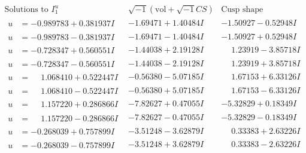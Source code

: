 \documentclass[1p]{elsarticle_modified}
\theoremstyle{definition}
\newcommand{\I}{\sqrt{-1}}
\begin{document}
$$\begin{array}{c|c|c}  
\text{Solutions to }I^u_{1}& \I (\text{vol} + \sqrt{-1}CS) & \text{Cusp shape}\\
 \hline 
\begin{aligned}
u &= -0.989783 + 0.381937 I\end{aligned}
 & -1.69471 + 1.40484 I & -1.50927 - 0.52948 I \\ \hline\begin{aligned}
u &= -0.989783 - 0.381937 I\end{aligned}
 & -1.69471 - 1.40484 I & -1.50927 + 0.52948 I \\ \hline\begin{aligned}
u &= -0.728347 + 0.560551 I\end{aligned}
 & -1.44038 + 2.19128 I & \phantom{-}1.23919 - 3.85718 I \\ \hline\begin{aligned}
u &= -0.728347 - 0.560551 I\end{aligned}
 & -1.44038 - 2.19128 I & \phantom{-}1.23919 + 3.85718 I \\ \hline\begin{aligned}
u &= \phantom{-}1.068410 + 0.522447 I\end{aligned}
 & -0.56380 - 5.07185 I & \phantom{-}1.67153 + 6.33126 I \\ \hline\begin{aligned}
u &= \phantom{-}1.068410 - 0.522447 I\end{aligned}
 & -0.56380 + 5.07185 I & \phantom{-}1.67153 - 6.33126 I \\ \hline\begin{aligned}
u &= \phantom{-}1.157220 + 0.286866 I\end{aligned}
 & -7.82627 + 0.47055 I & -5.32829 + 0.18349 I \\ \hline\begin{aligned}
u &= \phantom{-}1.157220 - 0.286866 I\end{aligned}
 & -7.82627 - 0.47055 I & -5.32829 - 0.18349 I \\ \hline\begin{aligned}
u &= -0.268039 + 0.757899 I\end{aligned}
 & -3.51248 - 3.62879 I & \phantom{-}0.33383 + 2.63226 I \\ \hline\begin{aligned}
u &= -0.268039 - 0.757899 I\end{aligned}
 & -3.51248 + 3.62879 I & \phantom{-}0.33383 - 2.63226 I \\ \hline\begin{aligned}

\end{aligned}
\end{array}$$
\end{document}
